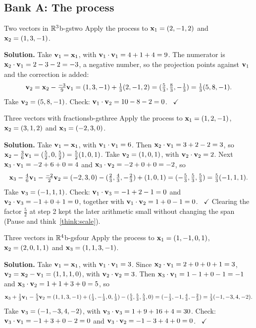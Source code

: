 \documentclass[11pt]{article}
\begin{document}
\subsection*{Bank A: The process}
\begin{exmp}{Two vectors in $\mathbb{R}^3$}{b-gstwo}
Apply the process to $\mathbf{x}_1=(2,-1,2)$ and $\mathbf{x}_2=(1,3,-1)$.

\textbf{Solution.} Take $\mathbf{v}_1=\mathbf{x}_1$, with $\mathbf{v}_1\cdot\mathbf{v}_1=4+1+4=9$. The numerator is $\mathbf{x}_2\cdot\mathbf{v}_1=2-3-2=-3$, a negative number, so the projection points against $\mathbf{v}_1$ and the correction is added:
\[
\mathbf{v}_2=\mathbf{x}_2-\tfrac{-3}9\mathbf{v}_1=(1,3,-1)+\tfrac13(2,-1,2)=(\tfrac53,\tfrac83,-\tfrac13)=\tfrac13(5,8,-1).
\]
Take $\mathbf{v}_2=(5,8,-1)$. Check: $\mathbf{v}_1\cdot\mathbf{v}_2=10-8-2=0$. \ $\checkmark$
\end{exmp}

\begin{exmp}{Three vectors with fractions}{b-gsthree}
Apply the process to $\mathbf{x}_1=(1,2,-1)$, $\mathbf{x}_2=(3,1,2)$ and $\mathbf{x}_3=(-2,3,0)$.

\textbf{Solution.} Take $\mathbf{v}_1=\mathbf{x}_1$, with $\mathbf{v}_1\cdot\mathbf{v}_1=6$. Then $\mathbf{x}_2\cdot\mathbf{v}_1=3+2-2=3$, so $\mathbf{x}_2-\tfrac36\mathbf{v}_1=(\tfrac52,0,\tfrac52)=\tfrac52(1,0,1)$. Take $\mathbf{v}_2=(1,0,1)$, with $\mathbf{v}_2\cdot\mathbf{v}_2=2$. Next $\mathbf{x}_3\cdot\mathbf{v}_1=-2+6+0=4$ and $\mathbf{x}_3\cdot\mathbf{v}_2=-2+0+0=-2$, so
\[
\mathbf{x}_3-\tfrac46\mathbf{v}_1-\tfrac{-2}2\mathbf{v}_2=(-2,3,0)-(\tfrac23,\tfrac43,-\tfrac23)+(1,0,1)=(-\tfrac53,\tfrac53,\tfrac53)=\tfrac53(-1,1,1).
\]
Take $\mathbf{v}_3=(-1,1,1)$. Check: $\mathbf{v}_1\cdot\mathbf{v}_3=-1+2-1=0$ and $\mathbf{v}_2\cdot\mathbf{v}_3=-1+0+1=0$, together with $\mathbf{v}_1\cdot\mathbf{v}_2=1+0-1=0$. \ $\checkmark$ Clearing the factor $\tfrac52$ at step 2 kept the later arithmetic small without changing the span (Pause and think~\ref{think:scale}).
\end{exmp}

\begin{exmp}{Three vectors in $\mathbb{R}^4$}{b-gsfour}
Apply the process to $\mathbf{x}_1=(1,-1,0,1)$, $\mathbf{x}_2=(2,0,1,1)$ and $\mathbf{x}_3=(1,1,3,-1)$.

\textbf{Solution.} Take $\mathbf{v}_1=\mathbf{x}_1$, with $\mathbf{v}_1\cdot\mathbf{v}_1=3$. Since $\mathbf{x}_2\cdot\mathbf{v}_1=2+0+0+1=3$, $\mathbf{v}_2=\mathbf{x}_2-\mathbf{v}_1=(1,1,1,0)$, with $\mathbf{v}_2\cdot\mathbf{v}_2=3$. Then $\mathbf{x}_3\cdot\mathbf{v}_1=1-1+0-1=-1$ and $\mathbf{x}_3\cdot\mathbf{v}_2=1+1+3+0=5$, so
\[
\mathbf{x}_3+\tfrac13\mathbf{v}_1-\tfrac53\mathbf{v}_2=(1,1,3,-1)+(\tfrac13,-\tfrac13,0,\tfrac13)-(\tfrac53,\tfrac53,\tfrac53,0)=(-\tfrac13,-1,\tfrac43,-\tfrac23)=\tfrac13(-1,-3,4,-2).
\]
Take $\mathbf{v}_3=(-1,-3,4,-2)$, with $\mathbf{v}_3\cdot\mathbf{v}_3=1+9+16+4=30$. Check: $\mathbf{v}_3\cdot\mathbf{v}_1=-1+3+0-2=0$ and $\mathbf{v}_3\cdot\mathbf{v}_2=-1-3+4+0=0$. \ $\checkmark$
\end{exmp}
\end{document}
